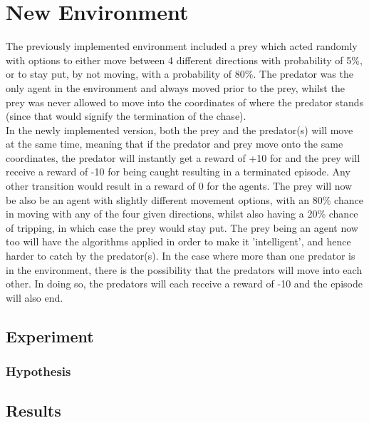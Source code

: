 \documentclass[a4paper,10pt]{article}
\begin{document}
\section{New Environment}
The previously implemented environment included a prey which acted randomly with options to either move between 4 different directions with probability of 5\%, or to stay put, by not moving, with a probability of 80\%. The predator was the only agent in the environment and always moved prior to the prey, whilst the prey was never allowed to move into the coordinates of where the predator stands (since that would signify the termination of the chase).\\
In the newly implemented version, both the prey and the predator(s) will move at the same time, meaning that if the predator and prey move onto the same coordinates, the predator will instantly get a reward of +10 for and the prey will receive a reward of -10 for being caught resulting in a terminated episode. Any other transition would result in a reward of 0 for the agents.
The prey will now be also be an agent with slightly different movement options, with an 80\% chance in moving with any of the  four given directions, whilst also having a 20\% chance of tripping, in which case the prey would stay put. The prey being an agent now too will have the algorithms applied in order to make it 'intelligent', and hence harder to catch by the predator(s). 
In the case where more than one predator is in the environment, there is the possibility that the predators will move into each other. In doing so, the predators will each receive a reward of -10 and the episode will also end.


\subsection{Experiment}



\subsubsection{Hypothesis}


\subsection{Results}


\end{document}
